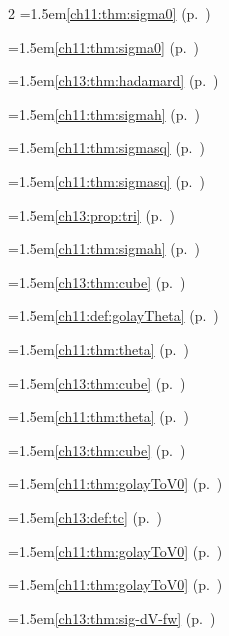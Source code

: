 \begin{multicols}{2}
\hangindent=1.5em\quad \ref{ch11:thm:sigma0} (p.~\pageref{ch11:thm:sigma0})\par
\hangindent=1.5em\quad \ref{ch11:thm:sigma0} (p.~\pageref{ch11:thm:sigma0})\par
\hangindent=1.5em\quad \ref{ch13:thm:hadamard} (p.~\pageref{ch13:thm:hadamard})\par
\hangindent=1.5em\quad \ref{ch11:thm:sigmah} (p.~\pageref{ch11:thm:sigmah})\par
\hangindent=1.5em\quad \ref{ch11:thm:sigmasq} (p.~\pageref{ch11:thm:sigmasq})\par
\hangindent=1.5em\quad \ref{ch11:thm:sigmasq} (p.~\pageref{ch11:thm:sigmasq})\par
\hangindent=1.5em\quad \ref{ch13:prop:tri} (p.~\pageref{ch13:prop:tri})\par
\hangindent=1.5em\quad \ref{ch11:thm:sigmah} (p.~\pageref{ch11:thm:sigmah})\par
\hangindent=1.5em\quad \ref{ch13:thm:cube} (p.~\pageref{ch13:thm:cube})\par
\hangindent=1.5em\quad \ref{ch11:def:golayTheta} (p.~\pageref{ch11:def:golayTheta})\par
\hangindent=1.5em\quad \ref{ch11:thm:theta} (p.~\pageref{ch11:thm:theta})\par
\hangindent=1.5em\quad \ref{ch13:thm:cube} (p.~\pageref{ch13:thm:cube})\par
\hangindent=1.5em\quad \ref{ch11:thm:theta} (p.~\pageref{ch11:thm:theta})\par
\hangindent=1.5em\quad \ref{ch13:thm:cube} (p.~\pageref{ch13:thm:cube})\par
\hangindent=1.5em\quad \ref{ch11:thm:golayToV0} (p.~\pageref{ch11:thm:golayToV0})\par
\hangindent=1.5em\quad \ref{ch13:def:tc} (p.~\pageref{ch13:def:tc})\par
\hangindent=1.5em\quad \ref{ch11:thm:golayToV0} (p.~\pageref{ch11:thm:golayToV0})\par
\hangindent=1.5em\quad \ref{ch11:thm:golayToV0} (p.~\pageref{ch11:thm:golayToV0})\par
\hangindent=1.5em\quad \ref{ch13:thm:sig-dV-fw} (p.~\pageref{ch13:thm:sig-dV-fw})\par

\end{multicols}
